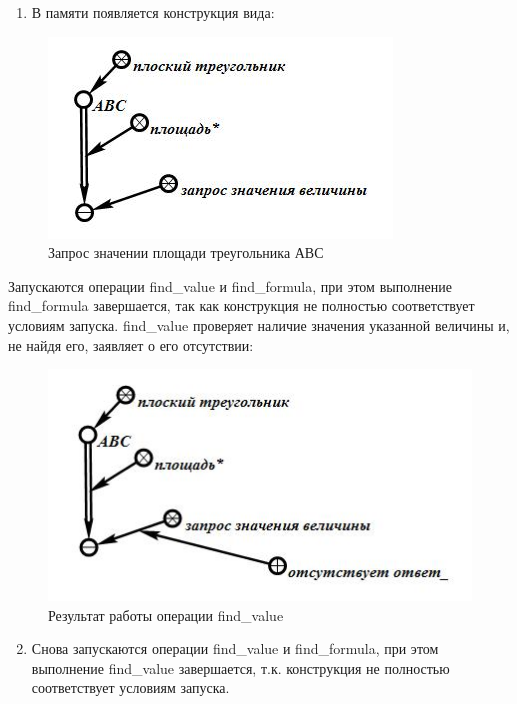 \begin{enumerate}
	\item
	В памяти появляется конструкция вида:
\end{enumerate}

\begin{figure}[H]
	\includegraphics[scale=0.5]{images/part7/chapter_learning_systems/step2.jpg}
	\caption{Запрос значении площади треугольника АВС}
	\label{fig:step2}
\end{figure}

Запускаются операции find\_value и find\_formula, при этом выполнение find\_formula завершается, так как конструкция не полностью соответствует условиям запуска. find\_value проверяет наличие значения указанной величины и, не найдя его, заявляет о его отсутствии:

\begin{figure}[H]
	\includegraphics[scale=0.5]{images/part7/chapter_learning_systems/step3.jpg}
	\caption{Результат работы операции find\_value}
	\label{fig:step3}
\end{figure}

\begin{enumerate}
	\setcounter{enumi}{1}
	\item
	Снова запускаются операции find\_value и find\_formula, при этом выполнение find\_value завершается, т.к. конструкция не полностью соответствует условиям запуска.
\end{enumerate}

